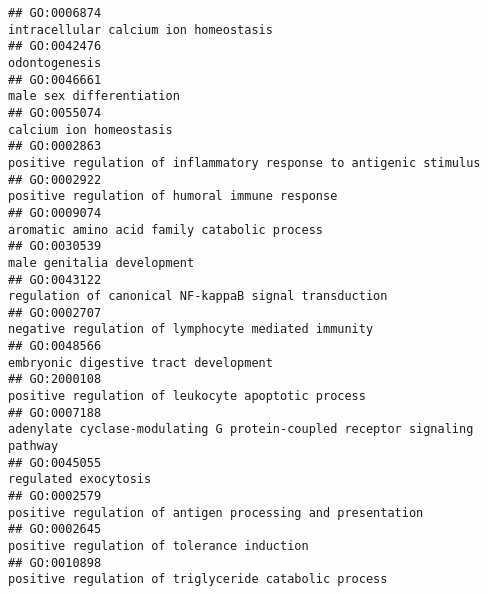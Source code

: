 \documentclass[
]{article}
\begin{document}
\begin{verbatim}
## GO:0006874                                                                                                            intracellular calcium ion homeostasis
## GO:0042476                                                                                                                                    odontogenesis
## GO:0046661                                                                                                                         male sex differentiation
## GO:0055074                                                                                                                          calcium ion homeostasis
## GO:0002863                                                                               positive regulation of inflammatory response to antigenic stimulus
## GO:0002922                                                                                                   positive regulation of humoral immune response
## GO:0009074                                                                                                     aromatic amino acid family catabolic process
## GO:0030539                                                                                                                       male genitalia development
## GO:0043122                                                                                            regulation of canonical NF-kappaB signal transduction
## GO:0002707                                                                                              negative regulation of lymphocyte mediated immunity
## GO:0048566                                                                                                            embryonic digestive tract development
## GO:2000108                                                                                               positive regulation of leukocyte apoptotic process
## GO:0007188                                                                        adenylate cyclase-modulating G protein-coupled receptor signaling pathway
## GO:0045055                                                                                                                             regulated exocytosis
## GO:0002579                                                                                       positive regulation of antigen processing and presentation
## GO:0002645                                                                                                       positive regulation of tolerance induction
## GO:0010898                                                                                            positive regulation of triglyceride catabolic process

\end{verbatim}
\end{document}
